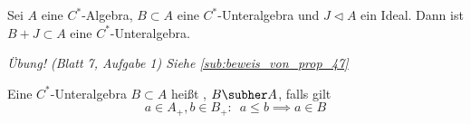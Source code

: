 \begin{proposition}[{name=[Summe von C*-Unteralgebra mit Ideal]},label=prop:47]
	Sei $A$ eine $C^*$-Algebra, $B \subset A$ eine $C^*$-Unteralgebra und $J \lhd A$ ein Ideal. Dann ist $B+J \subset A$ eine $C^*$-Unteralgebra.
\end{proposition}
\begin{beweis}
	\emph{Übung! (Blatt 7, Aufgabe 1) Siehe \cref{sub:beweis_von_prop_47}}
\end{beweis}

\begin{definition}[{name=[hereditäre C*-Unteralgebra]}]
	Eine $C^*$-Unteralgebra $B \subset A$ heißt , $B \subher A$, falls gilt
	\[
		a \in A_+, b \in B_+ : \enspace a \le b \implies a \in B
	\]
\end{definition}

